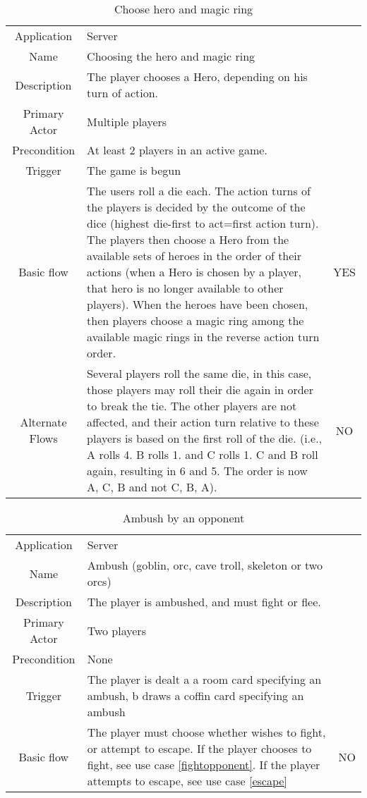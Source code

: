 \begin{table}
\label{choosehero}
\caption{Choose hero and magic ring}
\begin{tabular}{|c| p{9cm}|c}
\hline
Application & Server & \\
Name & Choosing the hero and magic ring & \\
Description & The player chooses a Hero, depending on his turn of action. & \\
Primary Actor & Multiple players & \\
Precondition & At least 2 players in an active game. & \\
Trigger & The game is begun & \\ \hline
Basic flow & The users roll a die each. The action turns of the players is decided by the outcome of the dice (highest die-first to act=first action turn). The players then choose a Hero from the available sets of heroes in the order of their actions (when a Hero is chosen by a player, that hero is no longer available to other players). When the heroes have been chosen, then players choose a magic ring among the available magic rings in the reverse action turn order. & YES \\ \hline
Alternate Flows & Several players roll the same die, in this case, those players may roll their die again in order to break the tie. The other players are not affected, and their action turn relative to these players is based on the first roll of the die. (i.e., A rolls 4. B rolls 1. and C rolls 1. C and B roll again, resulting in 6 and 5. The order is now A, C, B and not C, B, A). & NO\\
\hline
\end{tabular}
\end{table}


\begin{table}
\caption{Ambush by an opponent}
\label{ambushopponent}
\begin{tabular}{|c| p{9cm}|c}
\hline
Application & Server & \\
Name & Ambush (goblin, orc, cave troll, skeleton or two orcs) & \\
Description & The player is ambushed, and must fight or flee. & \\
Primary Actor & Two players & \\
Precondition & None & \\
Trigger & The player is dealt a a room card specifying an ambush, b draws a coffin card specifying an ambush & \\ \hline
Basic flow & The player must choose whether wishes to fight, or attempt to escape. If the player chooses to fight, see use case \ref{fightopponent}. If the player attempts to escape, see use case \ref{escape} & NO\\
\hline
\end{tabular}
\end{table}



